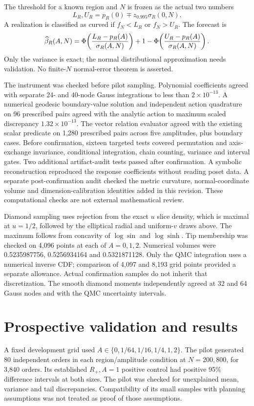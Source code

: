 \documentclass[11pt,a4paper]{article}
\begin{document}
The threshold for a known region and $N$ is frozen as the actual two numbers
\begin{equation}
 L_R,U_R=p_R(0)\mp z_{0.995}\sigma_R(0,N).
\end{equation}
A realization is classified as curved if $f_N<L_R$ or $f_N>U_R$.
The forecast is
\begin{equation}
 \widehat\beta_R(A,N)=
 \Phi\!\left({L_R-p_R(A)\over\sigma_R(A,N)}\right)
 +1-\Phi\!\left({U_R-p_R(A)\over\sigma_R(A,N)}\right). \label{forecast}
\end{equation}
Only the variance is exact; the normal distributional approximation needs
validation. No finite-$N$ normal-error theorem is asserted.

The instrument was checked before pilot sampling. Polynomial coefficients
agreed with separate 24- and 40-node Gauss integrations to less than
$2\times10^{-13}$. A numerical geodesic boundary-value solution and independent
action quadrature on 96 prescribed pairs agreed with the analytic action to
maximum scaled discrepancy $1.32\times10^{-13}$. The vector relation evaluator
agreed with the existing scalar predicate on 1,280 prescribed pairs across
five amplitudes, plus boundary cases. Before confirmation, sixteen targeted tests covered permutation
and axis-exchange invariance, conditional integration, chain counting, variance
and interval gates. Two additional artifact-audit tests passed after confirmation.
A symbolic reconstruction reproduced the response coefficients without reading
poset data. A separate post-confirmation audit checked the metric curvature,
normal-coordinate volume and dimension-calibration identities added in this
revision. These computational checks are not external mathematical review.

Diamond sampling uses rejection from the exact $u$ slice density, which is
maximal at $u=1/2$, followed by the elliptical radial and uniform-$v$ draws
above. The maximum follows from concavity of $\log\sin$ and $\log\sinh$.
Tip membership was checked on 4,096 points at each of $A=0,1,2$.
Numerical volumes were 0.5235987756, 0.5256934164 and 0.5321871128.
Only the QMC integration uses a numerical inverse CDF; comparison of 4,097
and 8,193 grid points provided a separate allowance. Actual confirmation samples
do not inherit that discretization. The smooth diamond moments independently
agreed at 32 and 64 Gauss nodes and with the QMC uncertainty intervals.

\section{Prospective validation and results}
A fixed development grid used $A\in\{0,1/64,1/16,1/4,1,2\}$.
The pilot generated 80 independent orders in each region/amplitude condition
at $N=200,800$, for 3,840 orders. Its established $R_+,A=1$ positive control
had positive 95\% difference intervals at both sizes. The pilot was checked
for unexplained mean, variance and tail discrepancies. Compatibility of its
small samples with planning assumptions was not treated as proof of those assumptions.
\end{document}
